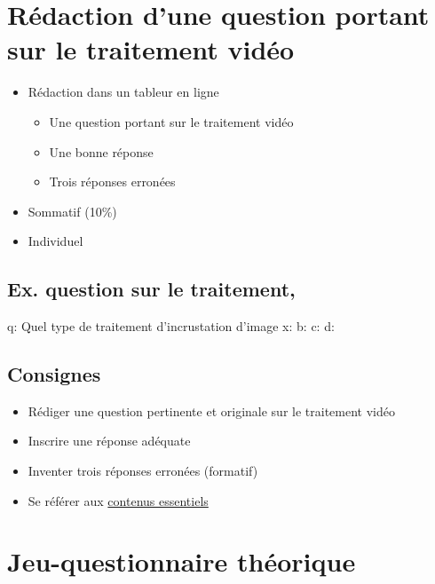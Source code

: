 \documentclass[
  french,
]{book}
\providecommand{\tightlist}{%
  \setlength{\itemsep}{0pt}\setlength{\parskip}{0pt}}
\begin{document}
\hypertarget{sommatif_2}{%
\section{Rédaction d'une question portant sur le traitement vidéo}\label{sommatif_2}}

\begin{itemize}
\tightlist
\item
  Rédaction dans un tableur en ligne

  \begin{itemize}
  \tightlist
  \item
    Une question portant sur le traitement vidéo
  \item
    Une bonne réponse
  \item
    Trois réponses erronées\\
  \end{itemize}
\item
  Sommatif (10\%)
\item
  Individuel
\end{itemize}

\hypertarget{ex.-question-sur-le-traitement}{%
\subsection{Ex. question sur le traitement,}\label{ex.-question-sur-le-traitement}}

q: Quel type de traitement d'incrustation d'image
x:
b:
c:
d:

\hypertarget{consignes-1}{%
\subsection{Consignes}\label{consignes-1}}

\begin{itemize}
\tightlist
\item
  Rédiger une question pertinente et originale sur le traitement vidéo
\item
  Inscrire une réponse adéquate
\item
  Inventer trois réponses erronées (formatif)
\item
  Se référer aux \href{}{contenus essentiels}
\end{itemize}

\hypertarget{sommatif_3}{%
\section{Jeu-questionnaire théorique}\label{sommatif_3}}
\end{document}
